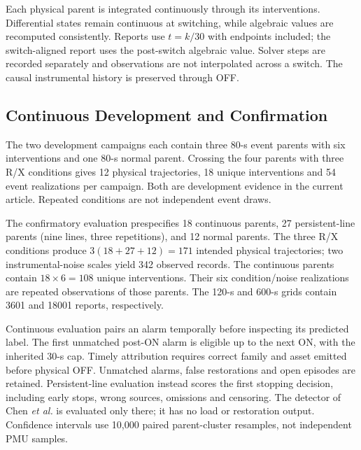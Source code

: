 Each physical parent is integrated continuously through its interventions.
Differential states remain continuous at switching, while algebraic values
are recomputed consistently. Reports use $t=k/30$ with endpoints included;
the switch-aligned report uses the post-switch algebraic value. Solver
steps are recorded separately and observations are not interpolated across
a switch. The causal instrumental history is preserved through OFF.

\subsection{Continuous Development and Confirmation}

The two development campaigns each contain three 80-s event parents with six interventions
and one 80-s normal parent. Crossing the four parents with three R/X
conditions gives 12 physical trajectories, 18 unique interventions and
54 event realizations per campaign. Both are development evidence in
the current article. Repeated conditions are not independent event draws.

The confirmatory evaluation prespecifies 18 continuous parents, 27 persistent-line parents
(nine lines, three repetitions), and 12 normal parents. The three R/X
conditions produce $3(18+27+12)=171$ intended physical trajectories;
two instrumental-noise scales yield 342 observed records. The continuous
parents contain $18\times6=108$ unique interventions. Their six
condition/noise realizations are repeated observations of those parents.
The 120-s and 600-s grids contain 3601 and 18001 reports, respectively.

Continuous evaluation pairs an alarm temporally before inspecting its
predicted label. The first unmatched post-ON alarm is eligible up to the
next ON, with the inherited 30-s cap. Timely attribution requires correct
family and asset emitted before physical OFF. Unmatched alarms, false
restorations and open episodes are retained. Persistent-line evaluation
instead scores the first stopping decision, including early stops,
wrong sources, omissions and censoring. The detector of Chen \emph{et al.} is evaluated only there;
it has no load or restoration output. Confidence intervals use 10,000
paired parent-cluster resamples, not independent PMU samples.

